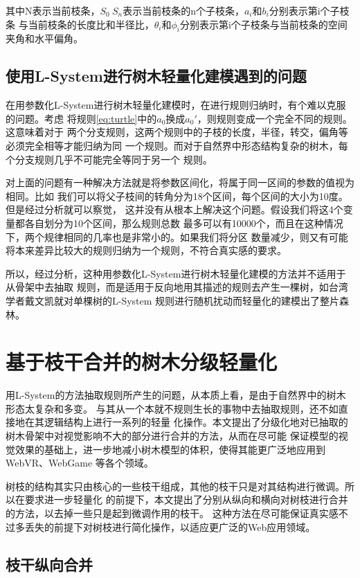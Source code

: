 其中N表示当前枝条，$S_0~S_n$表示当前枝条的n个子枝条，$a_i和b_i$分别表示第i个子枝条
与当前枝条的长度比和半径比，$\theta_i和\phi_i$分别表示第i个子枝条与当前枝条的空间
夹角和水平偏角。

\subsection{使用L-System进行树木轻量化建模遇到的问题}
在用参数化L-System进行树木轻量化建模时，在进行规则归纳时，有个难以克服的问题。考虑
将规则\ref{eq:turtle}中的$a_0$换成$a_0'$，则规则变成一个完全不同的规则。这意味着对于
两个分支规则，这两个规则中的子枝的长度，半径，转交，偏角等必须完全相等才能归纳为同
一个规则。而对于自然界中形态结构复杂的树木，每个分支规则几乎不可能完全等同于另一个
规则。

对上面的问题有一种解决方法就是将参数区间化，将属于同一区间的参数的值视为相同。比如
我们可以将父子枝间的转角分为18个区间，每个区间的大小为10度。但是经过分析就可以察觉，
这并没有从根本上解决这个问题。假设我们将这4个变量都各自划分为10个区间，那么规则总数
最多可以有10000个，而且在这种情况下，两个规律相同的几率也是非常小的。如果我们将分区
数量减少，则又有可能将本来差异比较大的规则归纳为一个规则，不符合真实感的要求。

所以，经过分析，这种用参数化L-System进行树木轻量化建模的方法并不适用于从骨架中去抽取
规则，而是适用于反向地用其描述的规则去产生一棵树，如台湾学者戴文凯就对单棵树的L-System
规则进行随机扰动而轻量化的建模出了整片森林。

\section{基于枝干合并的树木分级轻量化}
\label{subsec:branchmerge}
用L-System的方法抽取规则所产生的问题，从本质上看，是由于自然界中的树木形态太复杂和多变。
与其从一个本就不规则生长的事物中去抽取规则，还不如直接地在其逻辑结构上进行一系列的轻量
化操作。本文提出了分级化地对已抽取的树木骨架中对视觉影响不大的部分进行合并的方法，从而在尽可能
保证模型的视觉效果的基础上，进一步地减小树木模型的体积，使得其能更广泛地应用到WebVR、WebGame
等各个领域。

树枝的结构其实只由核心的一些枝干组成，其他的枝干只是对其结构进行微调。所以在要求进一步轻量化
的前提下，本文提出了分别从纵向和横向对树枝进行合并的方法，以去掉一些只是起到微调作用的枝干。
这种方法在尽可能保证真实感不过多丢失的前提下对树枝进行简化操作，以适应更广泛的Web应用领域。

\subsection{枝干纵向合并}

